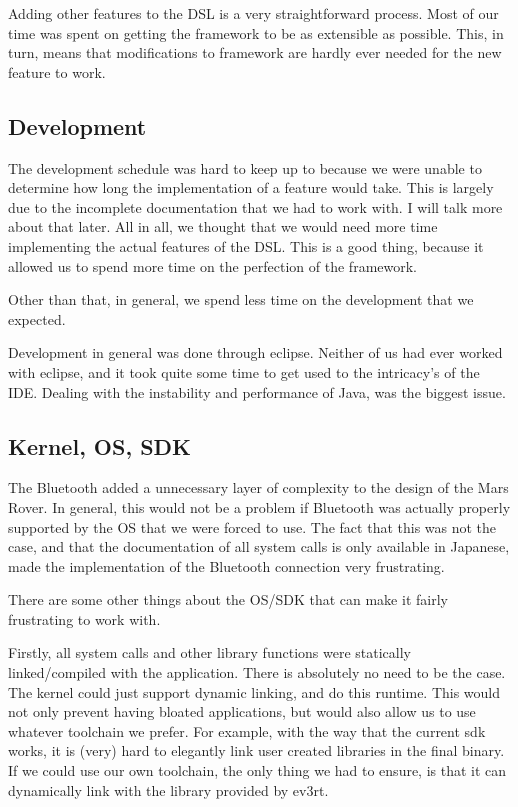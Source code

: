 \documentclass{scrartcl}
\begin{document}
Adding other features to the DSL is a very straightforward process.
Most of our time was spent on getting the framework to be as extensible as possible.
This, in turn, means that modifications to framework are hardly ever needed for the new feature to work.

\subsection{Development}
The development schedule was hard to keep up to because we were unable to determine how long the implementation of a feature would take.
This is largely due to the incomplete documentation that we had to work with.
I will talk more about that later.
All in all, we thought that we would need more time implementing the actual features of the DSL.
This is a good thing, because it allowed us to spend more time on the perfection of the framework.

Other than that, in general, we spend less time on the development that we expected.

Development in general was done through eclipse.
Neither of us had ever worked with eclipse, and it took quite some time to get used to the intricacy's of the IDE.
Dealing with the instability and performance of Java, was the biggest issue.

\subsection{Kernel, OS, SDK}
The Bluetooth added a unnecessary layer of complexity to the design of the Mars Rover.
In general, this would not be a problem if Bluetooth was actually properly supported by the OS that we were forced to use.
The fact that this was not the case, and that the documentation of all system calls is only available in Japanese, made the implementation of the Bluetooth connection very frustrating.

There are some other things about the OS/SDK that can make it fairly frustrating to work with.

Firstly, all system calls and other library functions were statically linked/compiled with the application.
There is absolutely no need to be the case.
The kernel could just support dynamic linking, and do this runtime.
This would not only prevent having bloated applications, but would also allow us to use whatever toolchain we prefer.
For example, with the way that the current sdk works, it is (very) hard to elegantly link user created libraries in the final binary.
If we could use our own toolchain, the only thing we had to ensure, is that it can dynamically link with the library provided by ev3rt.
\end{document}
